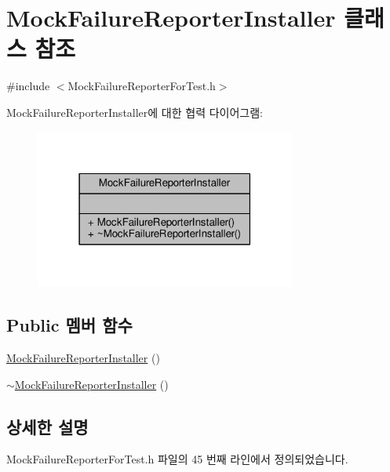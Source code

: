 \hypertarget{class_mock_failure_reporter_installer}{}\section{Mock\+Failure\+Reporter\+Installer 클래스 참조}
\label{class_mock_failure_reporter_installer}


{\ttfamily \#include $<$Mock\+Failure\+Reporter\+For\+Test.\+h$>$}



Mock\+Failure\+Reporter\+Installer에 대한 협력 다이어그램\+:
\nopagebreak
\begin{figure}[H]
\begin{center}
\leavevmode
\includegraphics[width=243pt]{class_mock_failure_reporter_installer__coll__graph}
\end{center}
\end{figure}
\subsection*{Public 멤버 함수}
\begin{DoxyCompactItemize}
\item 
\hyperlink{class_mock_failure_reporter_installer_ada857e250bfa0c1b49f559693c63045f}{Mock\+Failure\+Reporter\+Installer} ()
\item 
\hyperlink{class_mock_failure_reporter_installer_a3226611cfeb9c55b23461f9130068c7a}{$\sim$\+Mock\+Failure\+Reporter\+Installer} ()
\end{DoxyCompactItemize}


\subsection{상세한 설명}


Mock\+Failure\+Reporter\+For\+Test.\+h 파일의 45 번째 라인에서 정의되었습니다.



